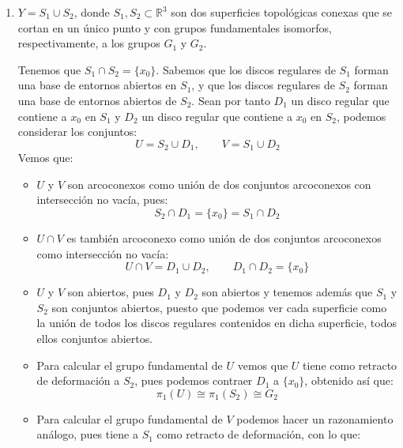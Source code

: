 \documentclass[12pt]{article}
\begin{document}
\begin{ejercicio}
\begin{enumerate}[label=\alph*)]
            \item $Y = S_1\cup S_2$, donde $S_1,S_2\subset \mathbb{R}^3$ son dos superficies topológicas conexas que se cortan en un único punto y con grupos fundamentales isomorfos, respectivamente, a los grupos $G_1$ y $G_2$.

                Tenemos que $S_1\cap S_2 = \{x_0\}$. Sabemos que los discos regulares de $S_1$ forman una base de entornos abiertos en $S_1$, y que los discos regulares de $S_2$ forman una base de entornos abiertos de $S_2$. Sean por tanto $D_1$ un disco regular que contiene a $x_0$ en $S_1$ y $D_2$ un disco regular que contiene a $x_0$ en $S_2$, podemos considerar los conjuntos:
                \begin{equation*}
                    U = S_2 \cup D_1, \qquad V = S_1\cup D_2
                \end{equation*}
                Vemos que:
                \begin{itemize}
                    \item $U$ y $V$ son arcoconexos como unión de dos conjuntos arcoconexos con intersección no vacía, pues:
                        \begin{equation*}
                            S_2\cap D_1 = \{x_0\} = S_1\cap D_2
                        \end{equation*}
                    \item $U\cap V$ es también arcoconexo como unión de dos conjuntos arcoconexos como intersección no vacía:
                        \begin{equation*}
                            U\cap V = D_1\cup D_2, \qquad D_1\cap D_2 = \{x_0\}
                        \end{equation*}
                    \item $U$ y $V$ son abiertos, pues $D_1$ y $D_2$ son abiertos y tenemos además que $S_1$ y $S_2$ son conjuntos abiertos, puesto que podemos ver cada superficie como la unión de todos los discos regulares contenidos en dicha superficie, todos ellos conjuntos abiertos.
                    \item Para calcular el grupo fundamental de $U$ vemos que $U$ tiene como retracto de deformación a $S_2$, pues podemos contraer $D_1$ a $\{x_0\}$, obtenido así que:
                        \begin{equation*}
                            \pi_1(U) \cong \pi_1(S_2) \cong G_2
                        \end{equation*}
                    \item Para calcular el grupo fundamental de $V$ podemos hacer un razonamiento análogo, pues tiene a $S_1$ como retracto de deformación, con lo que:

\end{itemize}
\end{enumerate}
\end{ejercicio}
\end{document}
